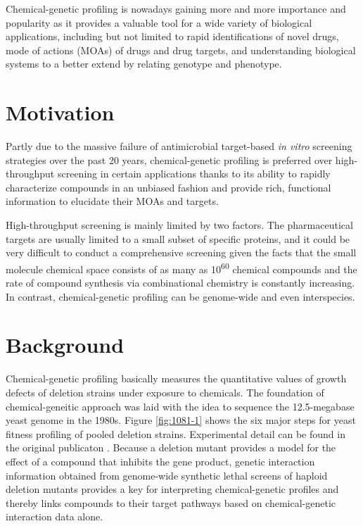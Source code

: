 \documentclass[12pt,fullpage,singlespace]{article}
\begin{document}
Chemical-genetic profiling is nowadays gaining more and more importance and popularity as it provides a valuable tool for a wide variety of biological applications, including but not limited to rapid identifications of novel drugs, mode of actions (MOAs) of drugs and drug targets, and understanding biological systems to a better extend by relating genotype and phenotype.

\section{Motivation}

Partly due to the massive failure of antimicrobial target-based \textit{in vitro} screening strategies over the past 20 years, chemical-genetic profiling is preferred over high-throughput screening in certain applications thanks to its ability to rapidly characterize compounds in an unbiased fashion and provide rich, functional information to elucidate their MOAs and targets.

High-throughput screening is mainly limited by two factors. The pharmaceutical targets are usually limited to a small subset of specific proteins, and it could be very difficult to conduct a comprehensive screening given the facts that the small molecule chemical space consists of as many as 10\textsuperscript{60} chemical compounds \citep{1104} and the rate of compound synthesis via combinational chemistry is constantly increasing. In contrast, chemical-genetic profiling can be genome-wide and even interspecies.

\section{Background}

Chemical-genetic profiling basically measures the quantitative values of growth defects of deletion strains under exposure to chemicals. The foundation of chemical-geneitic approach was laid with the idea to sequence the 12.5-megabase yeast genome in the 1980s. Figure \ref{fig:1081-1} shows the six major steps for yeast fitness profiling of pooled deletion strains. Experimental detail can be found in the original publicaton \citep{1081}. Because a deletion mutant provides a model for the effect of a compound that inhibits the gene product, genetic interaction information obtained from genome-wide synthetic lethal screens of haploid deletion mutants provides a key for interpreting chemical-genetic profiles and thereby links compounds to their target pathways based on chemical-genetic interaction data alone.
\end{document}
